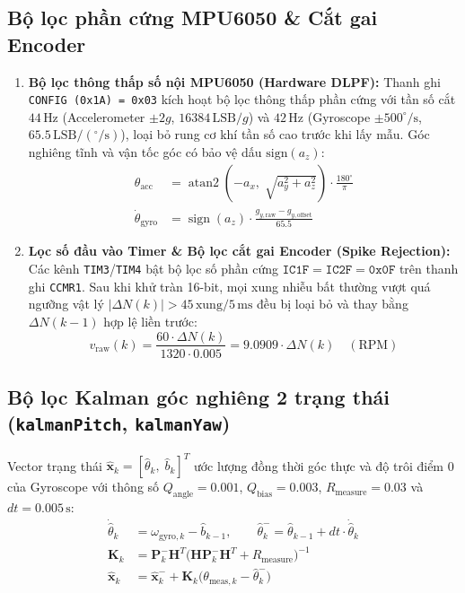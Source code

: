 \documentclass[10pt,a4paper,twocolumn]{article}
\begin{document}
\subsection{Bộ lọc phần cứng MPU6050 \& Cắt gai Encoder}
\begin{enumerate}
    \item \textbf{Bộ lọc thông thấp số nội MPU6050 (Hardware DLPF):} Thanh ghi \texttt{CONFIG (0x1A) = 0x03} kích hoạt bộ lọc thông thấp phần cứng với tần số cắt $44\,\text{Hz}$ (Accelerometer $\pm 2g$, $16384\,\text{LSB}/g$) và $42\,\text{Hz}$ (Gyroscope $\pm 500^\circ/\text{s}$, $65.5\,\text{LSB}/(^\circ/\text{s})$), loại bỏ rung cơ khí tần số cao trước khi lấy mẫu. Góc nghiêng tĩnh và vận tốc góc có bảo vệ dấu $\text{sign}(a_z)$:
    \begin{align}
        \theta_{\text{acc}} &= \operatorname{atan2}\!\left(-a_x,\; \sqrt{a_y^2 + a_z^2}\right) \cdot \frac{180^\circ}{\pi} \\
        \dot{\theta}_{\text{gyro}} &= \operatorname{sign}(a_z) \cdot \frac{g_{y,\text{raw}} - g_{y,\text{offset}}}{65.5}
    \end{align}
    \item \textbf{Lọc số đầu vào Timer \& Bộ lọc cắt gai Encoder (Spike Rejection):} Các kênh \texttt{TIM3}/\texttt{TIM4} bật bộ lọc số phần cứng $\texttt{IC1F} = \texttt{IC2F} = \texttt{0x0F}$ trên thanh ghi \texttt{CCMR1}. Sau khi khử tràn 16-bit, mọi xung nhiễu bất thường vượt quá ngưỡng vật lý $|\Delta N(k)| > 45\,\text{xung}/5\,\text{ms}$ đều bị loại bỏ và thay bằng $\Delta N(k-1)$ hợp lệ liền trước:
    \begin{equation}
        v_{\text{raw}}(k) = \frac{60 \cdot \Delta N(k)}{1320 \cdot 0.005} = 9.0909 \cdot \Delta N(k) \quad (\text{RPM})
    \end{equation}
\end{enumerate}

\subsection{Bộ lọc Kalman góc nghiêng 2 trạng thái (\texttt{kalmanPitch}, \texttt{kalmanYaw})}
Vector trạng thái $\hat{\mathbf{x}}_k = [\hat{\theta}_k,\; \hat{b}_k]^T$ ước lượng đồng thời góc thực và độ trôi điểm 0 của Gyroscope với thông số $Q_{\text{angle}} = 0.001$, $Q_{\text{bias}} = 0.003$, $R_{\text{measure}} = 0.03$ và $dt = 0.005\,\text{s}$:
\begin{align}
    \dot{\hat{\theta}}_k &= \omega_{\text{gyro},k} - \hat{b}_{k-1}, \qquad \hat{\theta}_k^- = \hat{\theta}_{k-1} + dt \cdot \dot{\hat{\theta}}_k \\
    \mathbf{K}_k &= \mathbf{P}_k^- \mathbf{H}^T \big(\mathbf{H}\mathbf{P}_k^- \mathbf{H}^T + R_{\text{measure}}\big)^{-1} \\
    \hat{\mathbf{x}}_k &= \hat{\mathbf{x}}_k^- + \mathbf{K}_k \big(\theta_{\text{meas},k} - \hat{\theta}_k^-\big)
\end{align}
\end{document}
